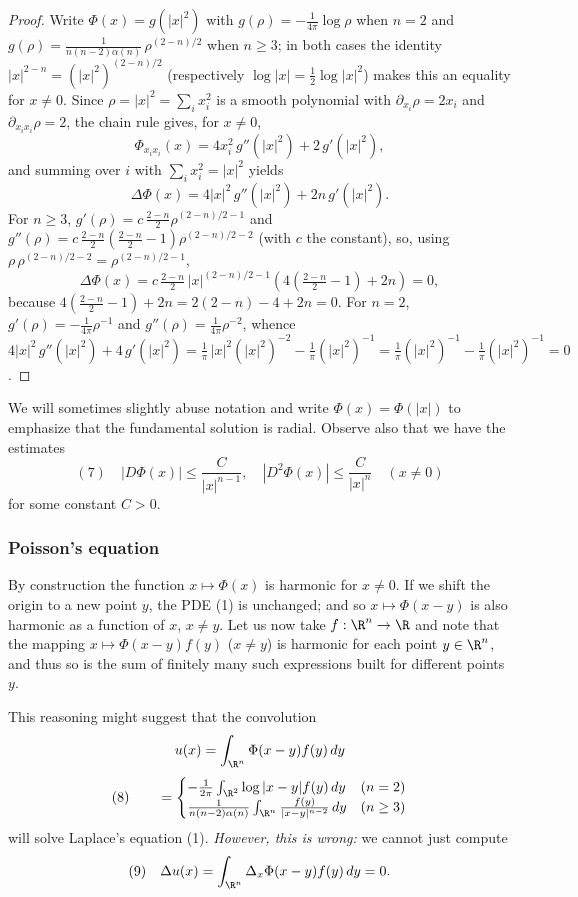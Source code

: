 \begin{proof}
\leanok
Write $\Phi(x) = g(|x|^2)$ with $g(\rho) = -\tfrac{1}{4\pi}\log\rho$ when $n = 2$ and $g(\rho) = \tfrac{1}{n(n-2)\alpha(n)}\,\rho^{(2-n)/2}$ when $n \ge 3$; in both cases the identity $|x|^{2-n} = (|x|^2)^{(2-n)/2}$ (respectively $\log|x| = \tfrac12\log|x|^2$) makes this an equality for $x \neq 0$. Since $\rho = |x|^2 = \sum_i x_i^2$ is a smooth polynomial with $\partial_{x_i}\rho = 2x_i$ and $\partial_{x_i x_i}\rho = 2$, the chain rule gives, for $x \neq 0$,
$$\Phi_{x_i x_i}(x) = 4x_i^2\, g''(|x|^2) + 2\, g'(|x|^2),$$
and summing over $i$ with $\sum_i x_i^2 = |x|^2$ yields
$$\Delta\Phi(x) = 4|x|^2\, g''(|x|^2) + 2n\, g'(|x|^2).$$
For $n \ge 3$, $g'(\rho) = c\,\tfrac{2-n}{2}\rho^{(2-n)/2 - 1}$ and $g''(\rho) = c\,\tfrac{2-n}{2}\left(\tfrac{2-n}{2}-1\right)\rho^{(2-n)/2 - 2}$ (with $c$ the constant), so, using $\rho\,\rho^{(2-n)/2-2} = \rho^{(2-n)/2-1}$,
$$\Delta\Phi(x) = c\,\tfrac{2-n}{2}\,|x|^{(2-n)/2-1}\left(4\left(\tfrac{2-n}{2}-1\right) + 2n\right) = 0,$$
because $4\left(\tfrac{2-n}{2}-1\right) + 2n = 2(2-n) - 4 + 2n = 0$. For $n = 2$, $g'(\rho) = -\tfrac{1}{4\pi}\rho^{-1}$ and $g''(\rho) = \tfrac{1}{4\pi}\rho^{-2}$, whence $4|x|^2\,g''(|x|^2) + 4\,g'(|x|^2) = \tfrac{1}{\pi}\,|x|^2(|x|^2)^{-2} - \tfrac{1}{\pi}(|x|^2)^{-1} = \tfrac{1}{\pi}(|x|^2)^{-1} - \tfrac{1}{\pi}(|x|^2)^{-1} = 0$.
\end{proof}

We will sometimes slightly abuse notation and write $\Phi(x) = \Phi(|x|)$ to emphasize that the fundamental solution is radial. Observe also that we have the estimates
$$(7) \quad |D\Phi(x)| \leq \frac{C}{|x|^{n-1}}, \quad |D^2\Phi(x)| \leq \frac{C}{|x|^n} \quad (x \neq 0)$$
for some constant $C > 0$.

\subsubsection{Poisson's equation}
\label{sec:laplace-poissons-equation}

By construction the function $x \mapsto \Phi(x)$ is harmonic for $x \neq 0$. If we shift the origin to a new point $y$, the PDE (1) is unchanged; and so $x \mapsto \Phi(x - y)$ is also harmonic as a function of $x$, $x \neq y$. Let us now take $f: \R^n \to \R$ and note that the mapping $x \mapsto \Phi(x - y)f(y)$ ($x \neq y$) is harmonic for each point $y \in \R^n$, and thus so is the sum of finitely many such expressions built for different points $y$.

This reasoning might suggest that the convolution
$$u(x) = \int_{\R^n} \Phi(x-y)f(y)\,dy$$
$$(8) \qquad = \begin{cases}
-\frac{1}{2\pi}\int_{\R^2}\log|x-y|f(y)\,dy & (n=2)\\
\frac{1}{n(n-2)\alpha(n)}\int_{\R^n}\frac{f(y)}{|x-y|^{n-2}}\,dy & (n \geq 3)
\end{cases}$$
will solve Laplace's equation (1). \textit{However, this is wrong:} we cannot just compute
$$(9) \quad \Delta u(x) = \int_{\R^n}\Delta_x\Phi(x-y)f(y)\,dy = 0.$$

